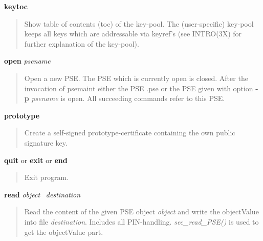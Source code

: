 {\bf keytoc}
\begin{quote}
Show table of contents (toc) of the key-pool. The (user-specific) key-pool keeps all
keys which are addressable via keyref's (see INTRO(3X) for further explanation of the key-pool).
\end{quote}

{\bf open} {\em psename}
\begin{quote}
Open a new PSE. The PSE which is currently open is closed. After the invocation 
of psemaint either the PSE .pse or the PSE
given with option {\bf -p} {\em psename} is open. All succeeding commands refer to this
PSE.
\end{quote}

{\bf prototype}
\begin{quote}
Create a self-signed prototype-certificate containing the own public signature key.
\end{quote}

{\bf quit} or {\bf exit} or {\bf end} 
\begin{quote}
Exit program.
\end{quote}

{\bf read} {\em object}~ {\em destination} 
\begin{quote}
Read the content of the given PSE object {\em object}
and write the objectValue into file {\em destination}. Includes all PIN-handling. 
{\em sec\_read\_PSE()} is used to get the objectValue part.
\end{quote}

